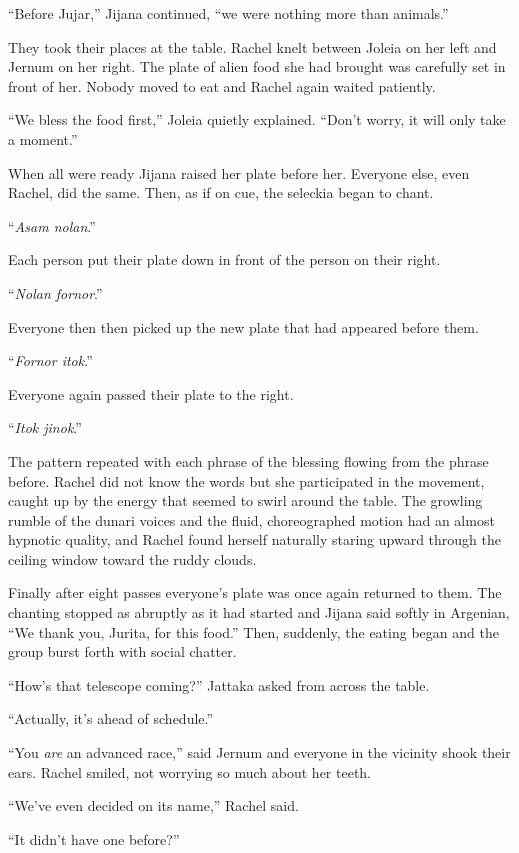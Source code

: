 ``Before Jujar,'' Jijana continued, ``we were nothing more than animals.''

They took their places at the table. Rachel knelt between Joleia on her left and Jernum on her
right. The plate of alien food she had brought was carefully set in front of her. Nobody moved
to eat and Rachel again waited patiently.

``We bless the food first,'' Joleia quietly explained. ``Don't worry, it will only take a
moment.''

When all were ready Jijana raised her plate before her. Everyone else, even Rachel, did the
same. Then, as if on cue, the seleckia began to chant.

``\textit{Asam nolan}.''

Each person put their plate down in front of the person on their right.

``\textit{Nolan fornor}.''

Everyone then then picked up the new plate that had appeared before them.

``\textit{Fornor itok}.''

Everyone again passed their plate to the right.

``\textit{Itok jinok}.''

The pattern repeated with each phrase of the blessing flowing from the phrase before. Rachel did
not know the words but she participated in the movement, caught up by the energy that seemed to
swirl around the table. The growling rumble of the dunari voices and the fluid, choreographed
motion had an almost hypnotic quality, and Rachel found herself naturally staring upward through
the ceiling window toward the ruddy clouds.

Finally after eight passes everyone's plate was once again returned to them. The chanting
stopped as abruptly as it had started and Jijana said softly in Argenian, ``We thank you,
Jurita, for this food.'' Then, suddenly, the eating began and the group burst forth with social
chatter.

``How's that telescope coming?'' Jattaka asked from across the table.

``Actually, it's ahead of schedule.''

``You \emph{are} an advanced race,'' said Jernum and everyone in the vicinity shook their ears.
Rachel smiled, not worrying so much about her teeth.

``We've even decided on its name,'' Rachel said.

``It didn't have one before?''


